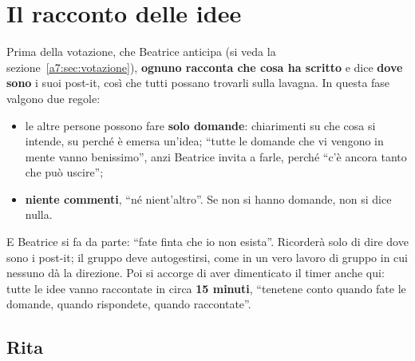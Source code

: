 \section{Il racconto delle idee}
\label{a7:sec:racconto}

Prima della votazione, che Beatrice anticipa (si veda la
sezione~\ref{a7:sec:votazione}), \textbf{ognuno racconta che cosa ha scritto} e dice
\textbf{dove sono} i suoi post-it, così che tutti possano trovarli sulla lavagna. In
questa fase valgono due regole:
\begin{itemize}
  \item le altre persone possono fare \textbf{solo domande}: chiarimenti su che cosa
        si intende, su perché è emersa un'idea; ``tutte le domande che vi vengono in
        mente vanno benissimo'', anzi Beatrice invita a farle, perché ``c'è ancora
        tanto che può uscire'';
  \item \textbf{niente commenti}, ``né nient'altro''. Se non si hanno domande, non si
        dice nulla.
\end{itemize}
E Beatrice si fa da parte: ``fate finta che io non esista''. Ricorderà solo di dire
dove sono i post-it; il gruppo deve autogestirsi, come in un vero lavoro di gruppo
in cui nessuno dà la direzione. Poi si accorge di aver dimenticato il timer anche
qui: tutte le idee vanno raccontate in circa \textbf{15 minuti}, ``tenetene conto
quando fate le domande, quando rispondete, quando raccontate''.

\subsection{Rita}
\label{a7:sec:idee-rita}

